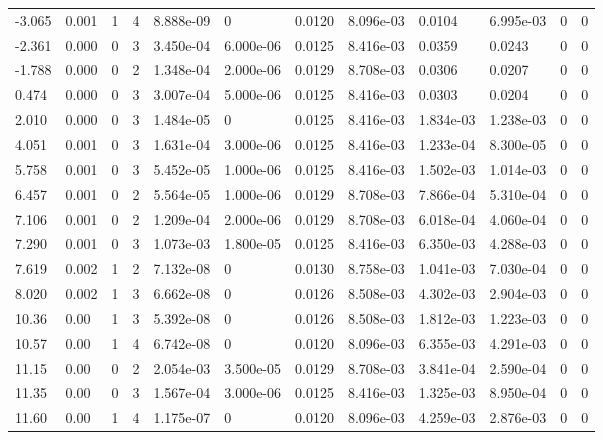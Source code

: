 \documentclass[preview]{standalone}
\begin{document}
{{\begin{tabular}{L{1.2cm}C{1.2cm} C{0.3cm}C{0.5cm} C{1.4cm}C{1.4cm} C{1.4cm}C{1.4cm} C{1.6cm}C{1.6cm} C{1.6cm}C{1.6cm}}
  -3.065  &  0.001  & 1     &  4 &  8.888e-09  & 0  &  0.0120&   8.096e-03& 0.0104 & 6.995e-03   &  0 & 0  \\ 
  -2.361  &  0.000  & 0     &  3 &  3.450e-04  & 6.000e-06  &  0.0125&   8.416e-03& 0.0359 & 0.0243   &  0 & 0  \\ 
  -1.788  &  0.000  & 0     &  2 &  1.348e-04  & 2.000e-06  &  0.0129&   8.708e-03& 0.0306 & 0.0207   &  0 & 0  \\ 
  0.474  &  0.000  & 0     &  3 &  3.007e-04  & 5.000e-06  &  0.0125&   8.416e-03& 0.0303 & 0.0204   &  0 & 0  \\ 
  2.010  &  0.000  & 0     &  3 &  1.484e-05  & 0  &  0.0125&   8.416e-03& 1.834e-03 & 1.238e-03   &  0 & 0  \\ 
  4.051  &  0.001  & 0     &  3 &  1.631e-04  & 3.000e-06  &  0.0125&   8.416e-03& 1.233e-04 & 8.300e-05   &  0 & 0  \\ 
  5.758  &  0.001  & 0     &  3 &  5.452e-05  & 1.000e-06  &  0.0125&   8.416e-03& 1.502e-03 & 1.014e-03   &  0 & 0  \\ 
  6.457  &  0.001  & 0     &  2 &  5.564e-05  & 1.000e-06  &  0.0129&   8.708e-03& 7.866e-04 & 5.310e-04   &  0 & 0  \\ 
  7.106  &  0.001  & 0     &  2 &  1.209e-04  & 2.000e-06  &  0.0129&   8.708e-03& 6.018e-04 & 4.060e-04   &  0 & 0  \\ 
  7.290  &  0.001  & 0     &  3 &  1.073e-03  & 1.800e-05  &  0.0125&   8.416e-03& 6.350e-03 & 4.288e-03   &  0 & 0  \\ 
  7.619  &  0.002  & 1     &  2 &  7.132e-08  & 0  &  0.0130&   8.758e-03& 1.041e-03 & 7.030e-04   &  0 & 0  \\ 
  8.020  &  0.002  & 1     &  3 &  6.662e-08  & 0  &  0.0126&   8.508e-03& 4.302e-03 & 2.904e-03   &  0 & 0  \\ 
  10.36  &  0.00  & 1     &  3 &  5.392e-08  & 0  &  0.0126&   8.508e-03& 1.812e-03 & 1.223e-03   &  0 & 0  \\ 
  10.57  &  0.00  & 1     &  4 &  6.742e-08  & 0  &  0.0120&   8.096e-03& 6.355e-03 & 4.291e-03   &  0 & 0  \\ 
  11.15  &  0.00  & 0     &  2 &  2.054e-03  & 3.500e-05  &  0.0129&   8.708e-03& 3.841e-04 & 2.590e-04   &  0 & 0  \\ 
  11.35  &  0.00  & 0     &  3 &  1.567e-04  & 3.000e-06  &  0.0125&   8.416e-03& 1.325e-03 & 8.950e-04   &  0 & 0  \\ 
  11.60  &  0.00  & 1     &  4 &  1.175e-07  & 0  &  0.0120&   8.096e-03& 4.259e-03 & 2.876e-03   &  0 & 0  \\ 

\end{tabular}}}
\end{document}
